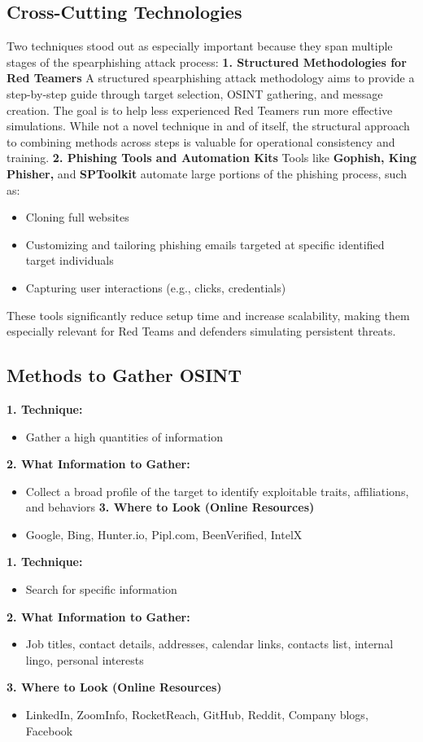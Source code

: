 \subsection{Cross-Cutting Technologies}
Two techniques stood out as especially important because they span multiple stages of the spearphishing attack process:
\textbf{1. Structured Methodologies for Red Teamers}
A structured spearphishing attack methodology aims to provide a step-by-step guide through target selection, OSINT gathering, and message creation. The goal is to help less experienced Red Teamers run more effective simulations. While not a novel technique in and of itself, the structural approach to combining methods across steps is valuable for operational consistency and training.
\textbf{2. Phishing Tools and Automation Kits}
Tools like \textbf{Gophish, King Phisher,} and \textbf{SPToolkit} automate large portions of the phishing process, such as:
\begin{itemize}
    \item Cloning full websites
    \item Customizing and tailoring phishing emails targeted at specific identified target individuals
    \item Capturing user interactions (e.g., clicks, credentials)
\end{itemize}
These tools significantly reduce setup time and increase scalability, making them especially relevant for Red Teams and defenders simulating persistent threats.

 \subsection{Methods to Gather OSINT}

\textbf{1. Technique:}
\begin{itemize}
    \item Gather a high quantities of information
\end{itemize}
\textbf{2. What Information to Gather:}
\begin{itemize}
    \item Collect a broad profile of the target to identify exploitable traits, affiliations, and behaviors
\textbf{3. Where to Look (Online Resources)}
    \item Google, Bing, Hunter.io, Pipl.com, BeenVerified, IntelX
\end{itemize}

\textbf{1. Technique:}
\begin{itemize}
    \item Search for specific information

\end{itemize}
\textbf{2. What Information to Gather:}
\begin{itemize}
    \item Job titles, contact details, addresses, calendar links, contacts list, internal lingo, personal interests
\end{itemize}
\textbf{3. Where to Look (Online Resources)}
\begin{itemize}
    \item LinkedIn, ZoomInfo, RocketReach, GitHub, Reddit, Company blogs, Facebook
\end{itemize}

